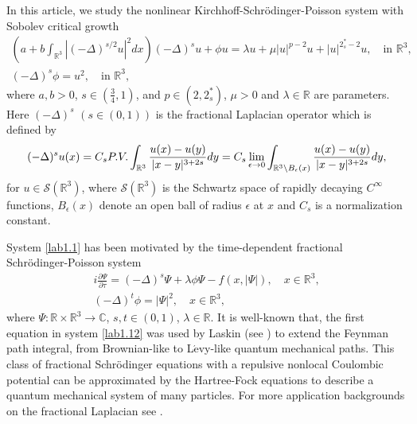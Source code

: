 \documentclass[11pt]{article}
\numberwithin{equation}{section}
\begin{document}
In this article, we study the nonlinear Kirchhoff-Schr\"odinger-Poisson system
with Sobolev critical growth
\begin{equation}\label{lab1.1}
\begin{gathered}
(a+b\int_{\mathbb{R}^3}|(-\Delta)^{s/2}u|^2dx)(-\Delta)^s u+ \phi u
= \lambda u+\mu|u|^{p-2}u+|u|^{{2^*_s}-2}u,  \quad \text{in }\mathbb{R}^3, \\
(-\Delta)^s \phi=u^2, \quad   \text{in }\mathbb{R}^3,
\end{gathered}
\end{equation}
where $a,b>0$, $s\in(\frac{3}{4},1)$, and  $p \in(2,2^*_s)$,  $\mu>0$ and
$\lambda \in \mathbb{R}$ are parameters.
Here $(-\Delta)^s$ $(s\in(0,1))$ is the fractional Laplacian operator which is
defined by
$$
(-\Delta)^s u(x)=C_s {\rm P.V.}\int_{\mathbb{R}^3}\frac{u(x)-u(y)}{|x-y|^{3+2s}}dy
=C_s\lim_{\epsilon\to 0}\int_{{\mathbb{R}^3}
\setminus B_\epsilon(x)}\frac{u(x)-u(y)}{|x-y|^{3+2s}}dy,
$$
for $u\in \mathcal{S}(\mathbb{R}^3)$, where $\mathcal{S}(\mathbb{R}^3) $ is the
Schwartz space  of rapidly decaying $C^\infty$ functions, $B_\epsilon(x)$ denote an
open ball of radius $\epsilon$ at $x$ and $C_s$ is a normalization constant.

System \eqref{lab1.1} has been motivated by the
time-dependent fractional Schr\"odinger-Poisson system
\begin{equation}\label{lab1.12}
\begin{gathered}
i\frac{\partial \Psi}{\partial \tau } =(-\Delta)^s\Psi +\lambda\phi\Psi-f(x,|\Psi|),
\quad  x\in \mathbb{R}^3,\\
(-\Delta)^t\phi=|\Psi|^2, \quad  x\in \mathbb{R}^3,
\end{gathered}
\end{equation}
where $\Psi: {\mathbb{R}\times \mathbb{R}^3}\to \mathbb{C}$, $s,t \in(0,1)$,
$\lambda \in \mathbb{R}$. It is well-known that, the first equation in
system \eqref{lab1.12} was used by Laskin (see \cite{L2998, L3998}) to extend the Feynman path integral, from Brownian-like to L$\mathrm {\acute{e}}$vy-like quantum mechanical paths. This class of fractional Schr\"odinger equations with a repulsive nonlocal Coulombic potential can be approximated by the Hartree-Fock equations to describe a quantum mechanical system of many particles. For more application backgrounds on the fractional Laplacian see \cite{C4998, D7998, M6998}.
\end{document}
